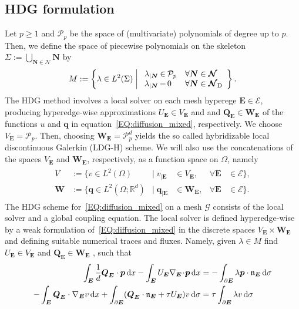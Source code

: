 \documentclass[a4paper, english, 12pt, reqno, draft]{amsart}
\theoremstyle{definition}
\theoremstyle{remark}
\numberwithin{equation}{section}
\newcommand{\Graph}{\ensuremath{\boldsymbol{\mathcal G}}}
\newcommand{\SetEdge}{\ensuremath{\boldsymbol{\mathcal E}}}
\newcommand{\SetNode}{\ensuremath{\boldsymbol{\mathcal N}}}
\newcommand{\SetNodeDir}{\ensuremath{\SetNode_\textup D}}
\newcommand{\Edge}{{\ensuremath{\boldsymbol E}}}
\newcommand{\Node}{{\ensuremath{\boldsymbol N}}}
\newcommand{\Nabla}{\ensuremath{\nabla_\Edge}}
\newcommand{\Div}{\ensuremath{\Nabla\!\cdot\!}}
\newcommand{\Normal}{\ensuremath{\mathfrak n_\Edge}}
\newcommand{\skeletal}{\ensuremath{\Sigma}}
\newcommand{\skeletalSpace}{\ensuremath{M}}
\newcommand{\discElementSpace}{\ensuremath{V}}
\newcommand{\polynomials}{\ensuremath{\mathcal P}}
\renewcommand{\vec}[1]{\ensuremath{\boldsymbol{#1}}}
\newcommand{\dx}{\ensuremath{\, \textup d x}}
\newcommand{\ds}{\ensuremath{\, \textup d \sigma}}
\begin{document}
\subsection{HDG formulation}\label{SEC:HDG_form}
% 
Let $p\ge 1$ and $\polynomials_p$ be the space of (multivariate)
polynomials of degree up to $p$. Then, we define the space of piecewise polynomials on the skeleton $\skeletal := \bigcup_{\Node \in \SetNode} \Node$ by
% 
\begin{gather}\label{EQ:skeletal_space}
 \skeletalSpace := \left\{ \lambda \in L^2(\skeletal) \;\middle|\;
 \begin{array}{r@{\,}c@{\,}ll}
  \lambda_{|\Node} &\in& \polynomials_p & \forall \Node \in \SetNode\\
  \lambda_{|\Node} &=& 0 & \forall \Node \in \SetNodeDir    
 \end{array}
 \right\}.
\end{gather}
% 
The HDG method involves a local solver on each mesh hyperege
$\Edge \in \SetEdge$, producing hyperedge-wise approximations $U_\Edge \in V_\Edge$ and and $\vec Q_\Edge \in \vec W_\Edge$ of the functions $u$ and $\vec q$ in equation~\eqref{EQ:diffusion_mixed}, respectively. We choose $V_\Edge = \polynomials_p$. Then, choosing
$\vec W_\Edge = \polynomials_p^d$ yields the so called hybridizable local discontinuous Galerkin (LDG-H) scheme. We will also use the concatenations of the spaces $V_\Edge$ and $\vec W_\Edge$, respectively, as a function space on $\Omega$, namely
\begin{gather}\label{EQ:dg_spaces}
 \begin{aligned}
  \discElementSpace &:=\bigl\{ v \in L^2(\Omega) & \big|\;v_{|\Edge} &\in V_\Edge, &\forall \Edge &\in \SetEdge \bigr\},\\
  \vec W &:=\bigl\{ \vec q \in L^2(\Omega;\mathbb R^d) & \big|\;\vec q_{|\Edge} &\in \vec W_\Edge, &\forall \Edge &\in \SetEdge \bigr\}.
 \end{aligned}
\end{gather}
% 
The HDG scheme for~\eqref{EQ:diffusion_mixed} on a mesh $\Graph$
consists of the local solver and a global coupling equation. The local solver is defined hyperedge-wise by a weak formulation
of~\eqref{EQ:diffusion_mixed} in the discrete spaces
$V_\Edge \times \vec W_\Edge$ and defining suitable numerical traces and fluxes. Namely, given $\lambda \in \skeletalSpace$ find $U_\Edge \in V_\Edge$ and $\vec Q_\Edge \in \vec W_\Edge$ , such that
% 
\begin{subequations}\label{EQ:hdg_scheme}
 \begin{align}
  \int_\Edge \frac{1}{d} \vec Q_\Edge \cdot \vec p \dx - \int_\Edge U_\Edge \Div \vec p \dx & = - \int_{\partial \Edge} \lambda \vec p \cdot \Normal \ds \label{EQ:hdg_primary}\\
  - \int_\Edge \vec Q_\Edge \cdot \Nabla v \dx  + \int_{\partial \Edge} ( \vec Q_\Edge \cdot \Normal + \tau  U_\Edge ) v \ds
  & = \tau \int_{\partial \Edge} \lambda v \ds \label{EQ:hdg_flux}
 \end{align}
\end{subequations}
\end{document}
